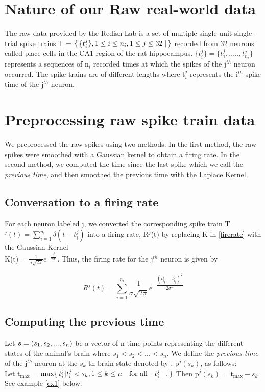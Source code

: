 \section{Nature of our Raw real-world data}
The raw data provided by the Redish Lab is a set of multiple single-unit single-trial
spike trains 
T = $\displaystyle \Set{ \{ t_{i}^{j} \} , 1 \leq i \leq n_{i}, 1 \leq j \leq 32 } $ 
recorded from 32 neurons called  place cells  in the CA1 region of the rat hippocampus.
$\displaystyle  \{t_{i}^{j}\} =  \{t_{1}^{j}, ....., t_{n_{i}}^{j} \} $ represents 
a sequences of n$_{i}$ recorded times at which the spikes of the j$^{th}$ neuron occurred.
The spike trains are of different lengths where t$_{i}^{j}$ represents the i$^{th}$
spike time of the j$^{th}$ neuron.

\section{Preprocessing raw spike train data}
We preprocessed the raw spikes using two methods.
In the first method, the raw spikes were smoothed with a Gaussian kernel to obtain a firing rate. In the second method, we computed the time since the last spike which we call the \textit{previous time}, and then smoothed the previous time with the Laplace Kernel.\\


\subsection{Conversation to a firing rate}
For each neuron labeled j,  we converted the corresponding spike train 
T$^{j}(t) = \displaystyle \sum_{i=1}^{n_{i}} \delta(t-t_{i}^{j}) $ into a firing rate,
 R$^{j}$(t) by replacing K in \eqref{firerate} with the  Gaussian Kernel\\
 K(t) =  $\displaystyle \frac{1}{\sigma \sqrt{2\pi}} e^{-\frac{t^2}{2\sigma^2}} $.
Thus, the firing rate for the j$^{th}$ neuron is given by

\begin{equation} \label{jfirerate}
R^{j}(t) = \sum_{i=1}^{n_{i}}  \frac{1}{\sigma \sqrt{2\pi}} 
e^{-\dfrac{(t_{i_{k}}^{j}  - t_{i_{l}}^{j})^2}{2\sigma^2}} 
\end{equation}

\subsection{Computing the previous time}
Let $\boldsymbol{s} = (s_1, s_2, ..., s_n)$  be a vector of n time points representing the different states of the animal's brain  where  $s_1 < s_2 < ... < s_n$. We  define the \textit{previous time} of the j$^{th}$ neuron at the $s_{k}$-th brain state  denoted by , p$^{j}(s_{k})$, as follows:\\
Let t$_{\max}$ = $\max  \{\, t^{j}_{i} | t^{j}_{i} < s_{k},
1 \leq k \leq n \quad \text{for all} \quad  t^{j}_{i} \mid.\,\}$ Then p$^{j}(s_{k})$ = t$_{\max} - s_{k}.$\\
See example  \eqref{ex1} below.


